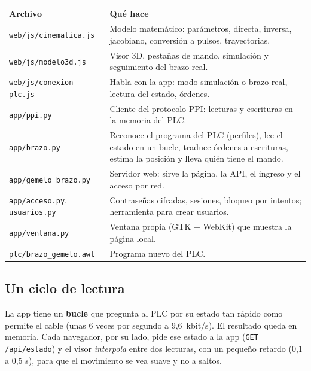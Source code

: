 \documentclass[a4paper,11pt]{article}
\newcommand{\codigo}[1]{\texttt{#1}}
\begin{document}
\begin{center}\small
\begin{tabularx}{\linewidth}{>{\raggedright}p{4.2cm} >{\raggedright\arraybackslash}X}
\toprule
\textbf{Archivo} & \textbf{Qué hace}\\
\midrule
\codigo{web/js/cinematica.js} & Modelo matemático: parámetros, directa, inversa, jacobiano, conversión a pulsos, trayectorias.\\
\codigo{web/js/modelo3d.js} & Visor 3D, pestañas de mando, simulación y seguimiento del brazo real.\\
\codigo{web/js/conexion-plc.js} & Habla con la app: modo simulación o brazo real, lectura del estado, órdenes.\\
\codigo{app/ppi.py} & Cliente del protocolo PPI: lecturas y escrituras en la memoria del PLC.\\
\codigo{app/brazo.py} & Reconoce el programa del PLC (perfiles), lee el estado en un bucle, traduce órdenes a escrituras, estima la posición y lleva quién tiene el mando.\\
\codigo{app/gemelo\_brazo.py} & Servidor web: sirve la página, la API, el ingreso y el acceso por red.\\
\codigo{app/acceso.py}, \codigo{usuarios.py} & Contraseñas cifradas, sesiones, bloqueo por intentos; herramienta para crear usuarios.\\
\codigo{app/ventana.py} & Ventana propia (GTK + WebKit) que muestra la página local.\\
\codigo{plc/brazo\_gemelo.awl} & Programa nuevo del PLC.\\
\bottomrule
\end{tabularx}
\end{center}

\subsection{Un ciclo de lectura}
La app tiene un \textbf{bucle} que pregunta al PLC por su estado tan rápido como permite el cable (unas 6 veces por segundo a 9,6~kbit/s). El resultado queda en memoria. Cada navegador, por su lado, pide ese estado a la app (\codigo{GET /api/estado}) y el visor \emph{interpola} entre dos lecturas, con un pequeño retardo (0,1 a 0,5 s), para que el movimiento se vea suave y no a saltos.
\end{document}
